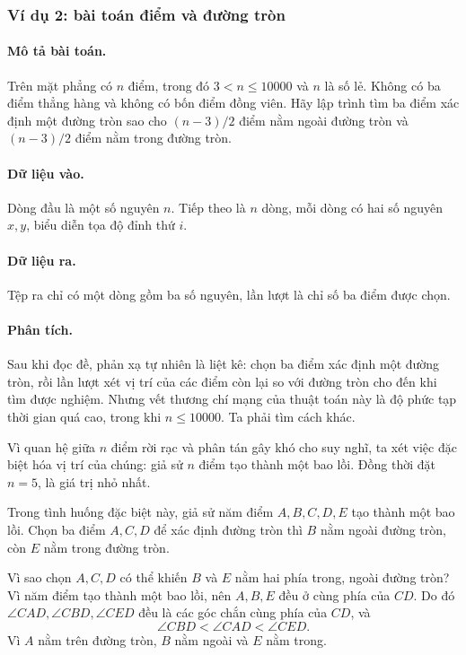 \documentclass[11pt]{article}
\begin{document}
\subsubsection*{Ví dụ 2: bài toán điểm và đường tròn}

\paragraph{Mô tả bài toán.}
Trên mặt phẳng có \(n\) điểm, trong đó \(3<n\le 10000\) và \(n\) là số lẻ.
Không có ba điểm thẳng hàng và không có bốn điểm đồng viên. Hãy lập trình tìm
ba điểm xác định một đường tròn sao cho \((n-3)/2\) điểm nằm ngoài đường
tròn và \((n-3)/2\) điểm nằm trong đường tròn.

\paragraph{Dữ liệu vào.}
Dòng đầu là một số nguyên \(n\). Tiếp theo là \(n\) dòng, mỗi dòng có hai số
nguyên \(x,y\), biểu diễn tọa độ đỉnh thứ \(i\).

\paragraph{Dữ liệu ra.}
Tệp ra chỉ có một dòng gồm ba số nguyên, lần lượt là chỉ số ba điểm được
chọn.

\paragraph{Phân tích.}
Sau khi đọc đề, phản xạ tự nhiên là liệt kê: chọn ba điểm xác định một đường
tròn, rồi lần lượt xét vị trí của các điểm còn lại so với đường tròn cho đến
khi tìm được nghiệm. Nhưng vết thương chí mạng của thuật toán này là độ phức
tạp thời gian quá cao, trong khi \(n\le 10000\). Ta phải tìm cách khác.

Vì quan hệ giữa \(n\) điểm rời rạc và phân tán gây khó cho suy nghĩ, ta xét
việc đặc biệt hóa vị trí của chúng: giả sử \(n\) điểm tạo thành một bao lồi.
Đồng thời đặt \(n=5\), là giá trị nhỏ nhất.

Trong tình huống đặc biệt này, giả sử năm điểm \(A,B,C,D,E\) tạo thành một
bao lồi. Chọn ba điểm \(A,C,D\) để xác định đường tròn thì \(B\) nằm ngoài
đường tròn, còn \(E\) nằm trong đường tròn.

Vì sao chọn \(A,C,D\) có thể khiến \(B\) và \(E\) nằm hai phía trong, ngoài
đường tròn? Vì năm điểm tạo thành một bao lồi, nên \(A,B,E\) đều ở cùng phía
của \(CD\). Do đó \(\angle CAD,\angle CBD,\angle CED\) đều là các góc chắn
cùng phía của \(CD\), và
\[
  \angle CBD<\angle CAD<\angle CED.
\]
Vì \(A\) nằm trên đường tròn, \(B\) nằm ngoài và \(E\) nằm trong.
\end{document}
